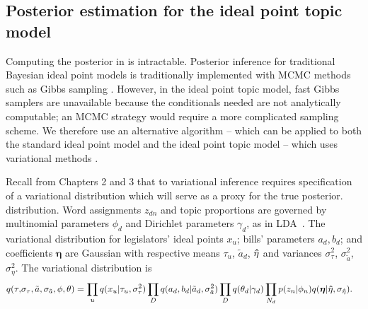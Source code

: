 






\subsection*{Posterior estimation for the ideal point topic model}
\label{sec:inference}
Computing the posterior in  is intractable.  Posterior
inference for traditional Bayesian ideal point models is traditionally
implemented with MCMC methods such as Gibbs sampling
\cite{johnson:1999ch6,jackman:2001,martin:2002,clinton:2004}.
However, in the ideal point topic model, fast Gibbs samplers are
unavailable because the conditionals needed are not analytically
computable; an MCMC strategy would require a more complicated sampling
scheme. We therefore use an alternative algorithm -- which can be applied
to both the standard ideal point model and the ideal point topic model
-- which uses variational methods \cite{jordan:1999}.

Recall from Chapters 2 and 3 that to variational inference requires
specification of a variational distribution which will serve as a
proxy for the true posterior.
distribution.  Word assignments $z_{dn}$ and topic proportions
are governed by multinomial parameters $\phi_d$ and Dirichlet
parameters $\gamma_d$, as in LDA~\cite{blei:2003}.  The variational
distribution for legislators' ideal points $x_u$; bills' parameters
$a_d, b_d$; and coefficients $\bm \eta$ are Gaussian with respective
means $\tau_u$, ${\tilde a}_d$, $\bm \hat \eta$ and variances $\sigma_\tau^2$,
$\sigma_{\tilde a}^2$, $\sigma_\eta^2$. The variational distribution is
\begin{align}
\label{eq:var_post}
q(\tau, & \sigma_\tau, {\tilde a}, \sigma_{\tilde a}, \phi, \theta) =
  \prod_u q(x_u | \tau_u, \sigma_\tau^2 ) \prod_D q(a_d, b_d |
{\tilde a}_d, \sigma_{\tilde a}^2 )
  \prod_D q(\theta_d | \gamma_d)
  \prod_{N_d} p(z_n | \phi_n) q(\bm \eta | \bm \hat \eta, \sigma_{\bm \hat \eta}).
\end{align}

